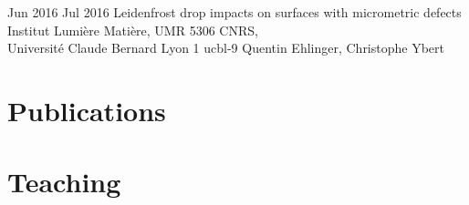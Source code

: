 \documentclass[letterpaper]{cvtemplate_en} %
\begin{document}
\begin{cvbody}
\cvitem
	{Jun 2016}
	{Jul 2016}
	{Leidenfrost drop impacts on surfaces with micrometric defects}
	{Institut Lumi\`ere Mati\`ere, UMR 5306 CNRS,\\
	Universit\'e Claude Bernard Lyon 1 }
	{ucbl}{}{-9}
	{Quentin Ehlinger, Christophe Ybert}

\end{cvbody}


\section{Publications}

\begin{cvbody}

\parbox[t]{\textwidth}{

\begin{refsection}
\nocite{*}
\printbibliography[heading=empty]
\end{refsection}

}

\end{cvbody}


\section{Teaching}
\end{document}
